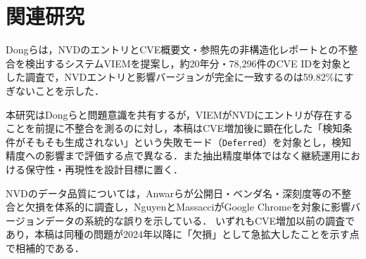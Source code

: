 \section{関連研究}
\label{sec:related}

Dongら\cite{dong2019}は，NVDのエントリとCVE概要文・参照先の非構造化レポートとの不整合を検出するシステムVIEMを提案し，約20年分・78,296件のCVE IDを対象とした調査で，NVDエントリと影響バージョンが完全に一致するのは59.82\%にすぎないことを示した．

本研究はDongらと問題意識を共有するが，VIEMがNVDにエントリが存在することを前提に不整合を測るのに対し，本稿はCVE増加後に顕在化した「検知条件がそもそも生成されない」という失敗モード（\texttt{Deferred}）を対象とし，検知精度への影響まで評価する点で異なる．また抽出精度単体ではなく継続運用における保守性・再現性を設計目標に置く．

NVDのデータ品質については，Anwarら\cite{anwar2022}が公開日・ベンダ名・深刻度等の不整合と欠損を体系的に調査し，NguyenとMassacci\cite{nguyen2013}がGoogle Chromeを対象に影響バージョンデータの系統的な誤りを示している．
いずれもCVE増加以前の調査であり，本稿は同種の問題が2024年以降に「欠損」として急拡大したことを示す点で相補的である．
